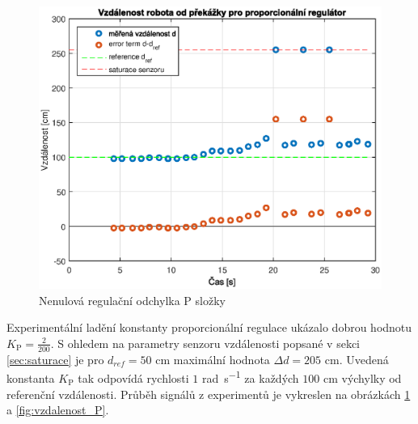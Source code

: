 \documentclass[conference]{IEEEtran}
\begin{document}
\begin{figure}[htbp]
    \centerline{\includegraphics[width=\linewidth]{proporcionalni_d_ustalena_odchylka.eps}}
    \caption{Nenulová regulační odchylka P složky}
    \label{fig:vzdalenost_P_odchylka}        
\end{figure}

Experimentální ladění konstanty proporcionální regulace ukázalo dobrou hodnotu $K_\text{P} = \frac{2}{200}$.
S ohledem na parametry senzoru vzdálenosti popsané v sekci \ref{sec:saturace} je pro $d_{ref} = 50$ \si{\centi\metre} maximální hodnota $\Delta d = 205$ \si{\centi\metre}.
Uvedená konstanta $K_\text{P}$ tak odpovídá rychlosti $1$ \si{\radian\per\second} za každých $100$ \si{\centi\metre} výchylky od referenční vzdálenosti.
Průběh signálů z experimentů je vykreslen na obrázkách \ref{fig:vzdalenost_P_odchylka} a \ref{fig:vzdalenost_P}.
\end{document}
